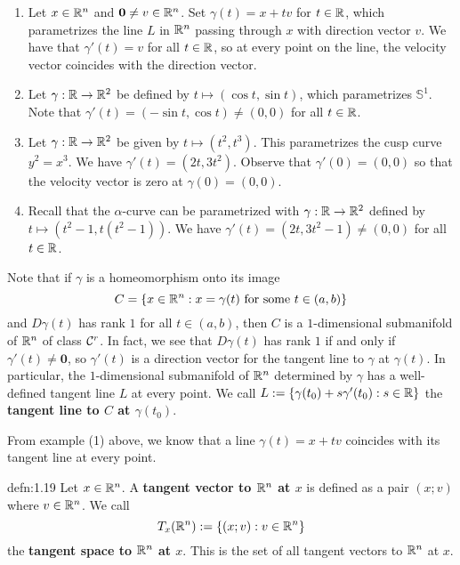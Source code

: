\begin{enumerate}[(1)]
    \item Let $x \in \mathbb{R}^n$ and $\mathbf 0 \neq v \in \mathbb{R}^n$. Set $\gamma(t) = x + tv$ 
    for $t \in \mathbb{R}$, which parametrizes the line $L$ in $\mathbb{R}^n$ passing through 
    $x$ with direction vector $v$. We have that $\gamma'(t) = v$ for all 
    $t \in \mathbb{R}$, so at every point on the line, the velocity vector coincides 
    with the direction vector. 

    \item Let $\gamma : \mathbb{R} \to \mathbb{R}^2$ be defined by $t \mapsto (\cos t, \sin t)$, 
    which parametrizes $\mathbb{S}^1$. Note that $\gamma'(t) = 
    (-\sin t, \cos t) \neq (0, 0)$ for all $t \in \mathbb{R}$. 

    \item Let $\gamma : \mathbb{R} \to \mathbb{R}^2$ be given by $t \mapsto (t^2, t^3)$. 
    This parametrizes the cusp curve $y^2 = x^3$. We have $\gamma'(t) = (2t, 3t^2)$. 
    Observe that $\gamma'(0) = (0, 0)$ so that the velocity vector 
    is zero at $\gamma(0) = (0, 0)$. 

    \item Recall that the $\alpha$-curve can be parametrized with 
    $\gamma : \mathbb{R} \to \mathbb{R}^2$ defined by $t \mapsto (t^2-1, t(t^2-1))$. 
    We have $\gamma'(t) = (2t, 3t^2-1) \neq (0, 0)$ for all $t \in \mathbb{R}$. 
\end{enumerate}

Note that if $\gamma$ is a homeomorphism onto its image 
\[ C = \{x \in \mathbb{R}^n : x = \gamma(t) \text{ for some } t \in (a, b)\} \] 
and $D\gamma(t)$ has rank $1$ for all $t \in (a, b)$, then $C$ is a 
$1$-dimensional submanifold of $\mathbb{R}^n$ of class ${\cal C}^r$. In fact, we see that
$D\gamma(t)$ has rank $1$ if and only if $\gamma'(t) \neq \mathbf 0$, so $\gamma'(t)$ 
is a direction vector for the tangent line to $\gamma$ at $\gamma(t)$. 
In particular, the $1$-dimensional submanifold of $\mathbb{R}^n$ determined by $\gamma$ 
has a well-defined tangent line $L$ at every point. We call 
$L := \{\gamma(t_0) + s\gamma'(t_0) : s \in \mathbb{R}\}$
the {\bf tangent line to $C$ at $\gamma(t_0)$}. 

From example (1) above, we know that a line $\gamma(t) = x + tv$ coincides 
with its tangent line at every point.

\begin{defn}{defn:1.19}
    Let $x \in \mathbb{R}^n$. A {\bf tangent vector to $\mathbb{R}^n$ at $x$} is defined as 
    a pair $(x; v)$ where $v \in \mathbb{R}^n$. We call 
    \[ T_x(\mathbb{R}^n) := \{(x; v) : v \in \mathbb{R}^n\} \] 
    the {\bf tangent space to $\mathbb{R}^n$ at $x$}. This is the set of all 
    tangent vectors to $\mathbb{R}^n$ at $x$. 
\end{defn}\vspace{-0.25cm}

